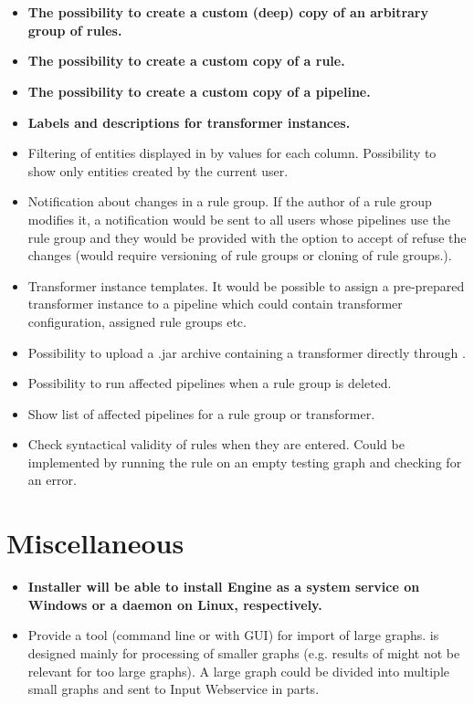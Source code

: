 \section{\FE}
\begin{itemize}
	\item \textbf{The possibility to create a custom (deep) copy of an arbitrary group of rules.}
	\item \textbf{The possibility to create a custom copy of a rule.}
	\item \textbf{The possibility to create a custom copy of a pipeline.}
	\item \textbf{Labels and descriptions for transformer instances.}
	\item Filtering of entities displayed in \FE by values for each column. Possibility to show only entities created by the current user.
	\item Notification about changes in a rule group. If the author of a rule group modifies it, a notification would be sent to all users whose pipelines use the rule group and they would be provided with the option to accept of refuse the changes (would require versioning of rule groups or cloning of rule groups.).
	\item Transformer instance templates. It would be possible to assign a pre-prepared transformer instance to a pipeline which could contain transformer configuration, assigned rule groups etc.
	\item Possibility to upload a .jar archive containing a transformer directly through \FE.
	\item Possibility to run affected pipelines when a rule group is deleted.
	\item Show list of affected pipelines for a rule group or transformer.
	\item Check syntactical validity of rules when they are entered. Could be implemented by running the rule on an empty testing graph and checking for an error.
\end{itemize}

\section{Miscellaneous}
\begin{itemize}
	\item \textbf{Installer will be able to install Engine as a system service on Windows or a daemon on Linux, respectively.}
	\item Provide a tool (command line or with GUI) for import of large graphs. \odcs is designed mainly for processing of smaller graphs (e.g. results of \QA might not be relevant for too large graphs). A large graph could be divided into multiple small graphs and sent to Input Webservice in parts.
\end{itemize}

